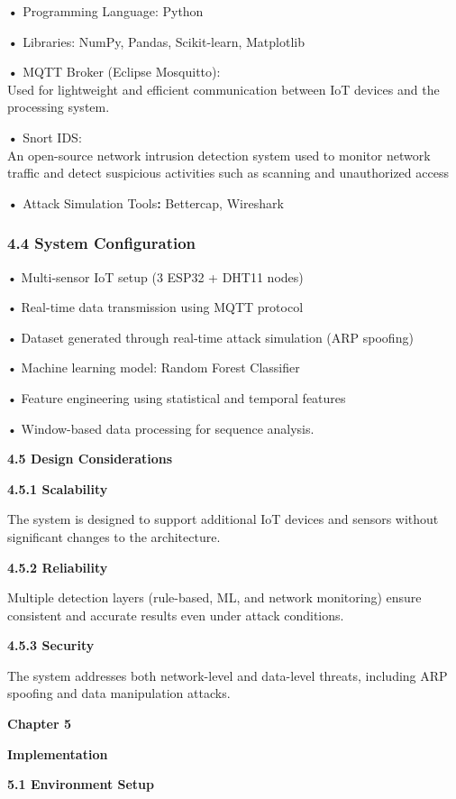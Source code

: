 \textbf{•} Programming Language: Python

\textbf{•} Libraries: NumPy, Pandas, Scikit-learn, Matplotlib

\textbf{•} MQTT Broker (Eclipse Mosquitto):\\
Used for lightweight and efficient communication between IoT devices and
the processing system.

\textbf{•} Snort IDS:\\
An open-source network intrusion detection system used to monitor
network traffic and detect suspicious activities such as scanning and
unauthorized access

\textbf{•} Attack Simulation Tools\textbf{:} Bettercap, Wireshark

\subsubsection{\texorpdfstring{\textbf{4.4 System
Configuration}}{4.4 System Configuration}}\label{system-configuration}

• Multi-sensor IoT setup (3 ESP32 + DHT11 nodes)

• Real-time data transmission using MQTT protocol

• Dataset generated through real-time attack simulation (ARP spoofing)

• Machine learning model: Random Forest Classifier

• Feature engineering using statistical and temporal features

• Window-based data processing for sequence analysis.

\textbf{4.5 Design Considerations}

\textbf{4.5.1 Scalability}

The system is designed to support additional IoT devices and sensors
without significant changes to the architecture.

\textbf{4.5.2 Reliability}

Multiple detection layers (rule-based, ML, and network monitoring)
ensure consistent and accurate results even under attack conditions.

\textbf{4.5.3 Security}

The system addresses both network-level and data-level threats,
including ARP spoofing and data manipulation attacks.

\textbf{Chapter 5}

\textbf{Implementation}

\textbf{5.1 Environment Setup}

